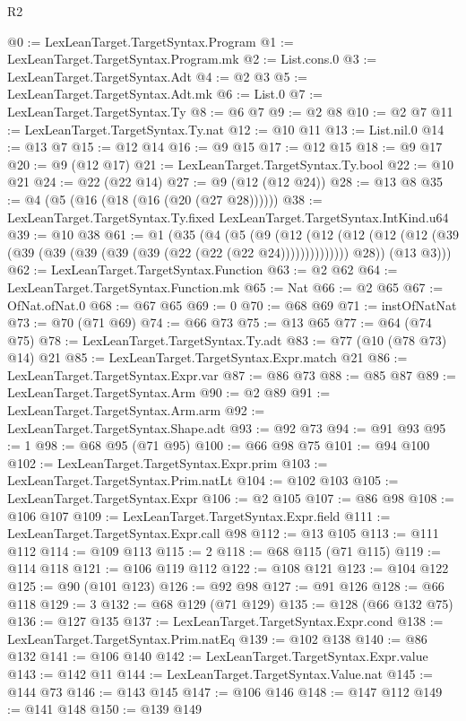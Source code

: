 \begin{lexlean}{R2}
\begin{coremodule}
@0 := LexLeanTarget.TargetSyntax.Program
@1 := LexLeanTarget.TargetSyntax.Program.mk
@2 := List.cons.{0}
@3 := LexLeanTarget.TargetSyntax.Adt
@4 := @2 @3
@5 := LexLeanTarget.TargetSyntax.Adt.mk
@6 := List.{0}
@7 := LexLeanTarget.TargetSyntax.Ty
@8 := @6 @7
@9 := @2 @8
@10 := @2 @7
@11 := LexLeanTarget.TargetSyntax.Ty.nat
@12 := @10 @11
@13 := List.nil.{0}
@14 := @13 @7
@15 := @12 @14
@16 := @9 @15
@17 := @12 @15
@18 := @9 @17
@20 := @9 (@12 @17)
@21 := LexLeanTarget.TargetSyntax.Ty.bool
@22 := @10 @21
@24 := @22 (@22 @14)
@27 := @9 (@12 (@12 @24))
@28 := @13 @8
@35 := @4 (@5 (@16 (@18 (@16 (@20 (@27 @28))))))
@38 := LexLeanTarget.TargetSyntax.Ty.fixed LexLeanTarget.TargetSyntax.IntKind.u64
@39 := @10 @38
@61 := @1
    (@35
      (@4
        (@5
          (@9
            (@12 (@12 (@12 (@12 (@12 (@39 (@39 (@39 (@39 (@39 (@39 (@22 (@22 (@22 @24))))))))))))))
            @28))
        (@13 @3)))
@62 := LexLeanTarget.TargetSyntax.Function
@63 := @2 @62
@64 := LexLeanTarget.TargetSyntax.Function.mk
@65 := Nat
@66 := @2 @65
@67 := OfNat.ofNat.{0}
@68 := @67 @65
@69 := 0
@70 := @68 @69
@71 := instOfNatNat
@73 := @70 (@71 @69)
@74 := @66 @73
@75 := @13 @65
@77 := @64 (@74 @75)
@78 := LexLeanTarget.TargetSyntax.Ty.adt
@83 := @77 (@10 (@78 @73) @14) @21
@85 := LexLeanTarget.TargetSyntax.Expr.match @21
@86 := LexLeanTarget.TargetSyntax.Expr.var
@87 := @86 @73
@88 := @85 @87
@89 := LexLeanTarget.TargetSyntax.Arm
@90 := @2 @89
@91 := LexLeanTarget.TargetSyntax.Arm.arm
@92 := LexLeanTarget.TargetSyntax.Shape.adt
@93 := @92 @73
@94 := @91 @93
@95 := 1
@98 := @68 @95 (@71 @95)
@100 := @66 @98 @75
@101 := @94 @100
@102 := LexLeanTarget.TargetSyntax.Expr.prim
@103 := LexLeanTarget.TargetSyntax.Prim.natLt
@104 := @102 @103
@105 := LexLeanTarget.TargetSyntax.Expr
@106 := @2 @105
@107 := @86 @98
@108 := @106 @107
@109 := LexLeanTarget.TargetSyntax.Expr.field
@111 := LexLeanTarget.TargetSyntax.Expr.call @98
@112 := @13 @105
@113 := @111 @112
@114 := @109 @113
@115 := 2
@118 := @68 @115 (@71 @115)
@119 := @114 @118
@121 := @106 @119 @112
@122 := @108 @121
@123 := @104 @122
@125 := @90 (@101 @123)
@126 := @92 @98
@127 := @91 @126
@128 := @66 @118
@129 := 3
@132 := @68 @129 (@71 @129)
@135 := @128 (@66 @132 @75)
@136 := @127 @135
@137 := LexLeanTarget.TargetSyntax.Expr.cond
@138 := LexLeanTarget.TargetSyntax.Prim.natEq
@139 := @102 @138
@140 := @86 @132
@141 := @106 @140
@142 := LexLeanTarget.TargetSyntax.Expr.value
@143 := @142 @11
@144 := LexLeanTarget.TargetSyntax.Value.nat
@145 := @144 @73
@146 := @143 @145
@147 := @106 @146
@148 := @147 @112
@149 := @141 @148
@150 := @139 @149

\end{coremodule}
\end{lexlean}
